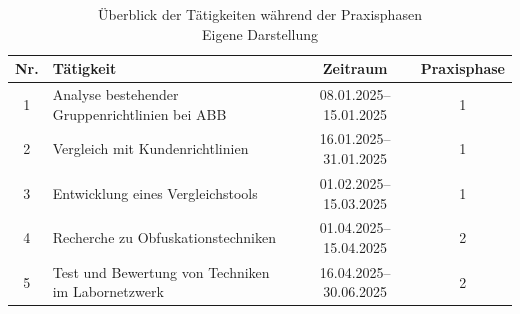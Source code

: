 \begin{table}[h]
\centering
\begin{tabularx}{\textwidth}{|c|X|c|c|}
\hline
\textbf{Nr.} & \textbf{Tätigkeit} & \textbf{Zeitraum} & \textbf{Praxisphase} \\
\hline
1 & Analyse bestehender Gruppenrichtlinien bei ABB & 08.01.2025–15.01.2025 & 1 \\
2 & Vergleich mit Kundenrichtlinien & 16.01.2025–31.01.2025 & 1 \\
3 & Entwicklung eines Vergleichstools & 01.02.2025–15.03.2025 & 1 \\
4 & Recherche zu Obfuskationstechniken & 01.04.2025–15.04.2025 & 2 \\
5 & Test und Bewertung von Techniken im Labornetzwerk & 16.04.2025–30.06.2025 & 2 \\
\hline
\end{tabularx}
\caption{Überblick der Tätigkeiten während der Praxisphasen \\
Eigene Darstellung}
\label{tab:taetigkeiten}
\end{table}